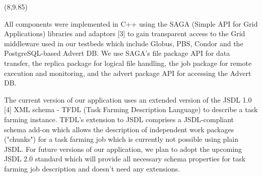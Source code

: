 \documentclass[a0b,portrait]{a0poster}
\def\LHead#1{\bigskip\bigskip\noindent{\huge\color{HeadColor} #1}\smallskip}
\begin{document}
\begin{textblock}{7}(8,9.85)

\color{Black}\large 

All components were implemented in C++ using the SAGA (Simple API for Grid
Applications) libraries and adaptors [3] to gain transparent access to the Grid
middleware used in our testbeds which include Globus, PBS, Condor and the 
PostgreSQL-based Advert DB. We use SAGA's file package API for data transfer, 
the replica package for logical file handling, the job package for remote 
execution and monitoring, and the advert package API for accessing the Advert
DB.\\[-1.4em]

\LHead{Job Description}

The current version of our application uses an extended version of the JSDL 1.0 [4]
XML schema - TFDL (Task Farming Description Language) to describe a task farming 
instance. TFDL's extension to JSDL comprises a JSDL-compliant schema add-on which
allows the description of independent work packages ("chunks") for a task farming 
job which is currently not possible using plain JSDL.
For future versions of our application, we plan to adopt the upcoming JSDL 2.0 
standard which will provide all necessary schema properties for task farming job
description and doesn't need any extensions.

\LHead{Results}


\end{textblock}
\end{document}
